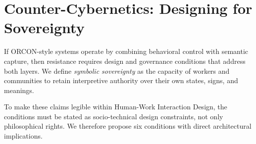 \documentclass[runningheads]{llncs}
\begin{document}
\section{Counter-Cybernetics: Designing for Sovereignty}

If ORCON-style systems operate by combining behavioral control with semantic capture, then resistance requires design and governance conditions that address both layers. We define \emph{symbolic sovereignty} as the capacity of workers and communities to retain interpretive authority over their own states, signs, and meanings.

To make these claims legible within Human-Work Interaction Design, the conditions must be stated as socio-technical design constraints, not only philosophical rights. We therefore propose six conditions with direct architectural implications.
\end{document}
